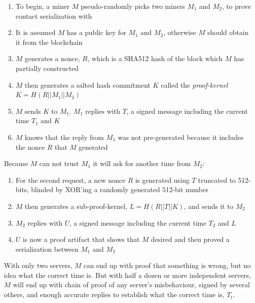 \documentclass[10pt, nonatbib, nocopyrightspace, reprint]{sigplanconf}
\begin{document}
\begin{enumerate}
        \item To begin, a miner $M$ pseudo-randomly picks two miners $M_1$ and $M_2$, to prove contact serialization with
        \item It is assumed $M$ has a public key for $M_1$ and $M_2$, otherwise $M$ should obtain it from the blockchain
        \item $M$ generates a nonce, $R$, which is a SHA512 hash of the block which $M$ has partially constructed
        \item $M$ then generates a salted hash commitment $K$ called the \emph{proof-kernel} ${K = H\left(R || M_1 || M_2\right)}$
        \item $M$ sends $K$ to $M_1$. $M_1$ replies with $T$, a signed message including the current time $T_1$ and $K$
        \item $M$ knows that the reply from $M_1$ was not pre-generated because it includes the nonce $R$ that $M$ generated
\end{enumerate}

Because $M$ can not trust $M_1$ it will ask for another time from $M_2$:

\begin{enumerate}
        \item For the second request, a new nonce $R$ is generated using $T$ truncated to 512-bits, blinded by XOR'ing a randomly generated 512-bit number
        \item $M$ then generates a sub-proof-kernel, $L = H\left(R || T || K\right)$, and sends it to $M_2$
        \item $M_2$ replies with $U$, a signed message including the current time $T_2$ and $L$
        \item $U$ is now a proof artifact that shows that $M$ desired and then proved a serialization between $M_1$ and $M_2$
\end{enumerate}

With only two servers, $M$ can end up with proof that something is wrong, but no idea what the correct time is. But with half a dozen or more independent servers, $M$ will end up with chain of proof of any server's misbehaviour, signed by several others, and enough accurate replies to establish what the correct time is, $T_t$.
\end{document}
